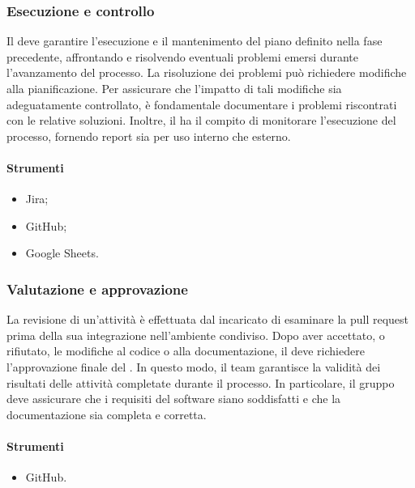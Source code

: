 \subsubsection{Esecuzione e controllo}
\par Il \Responsabile{} deve garantire l'esecuzione e il mantenimento del piano definito nella fase precedente, affrontando e risolvendo eventuali problemi emersi durante l'avanzamento del processo. La risoluzione dei problemi può richiedere modifiche alla pianificazione. Per assicurare che l'impatto di tali modifiche sia adeguatamente controllato, è fondamentale documentare i problemi riscontrati con le relative soluzioni. Inoltre, il \Responsabile{} ha il compito di monitorare l'esecuzione del processo, fornendo report sia per uso interno che esterno.

\paragraph*{Strumenti}
\IntroStrumenti
\begin{itemize}
  \item Jira;
  \item GitHub;
  \item Google Sheets.
\end{itemize}

\subsubsection{Valutazione e approvazione}
\par La revisione di un'attività è effettuata dal \Verificatore{} incaricato di esaminare la pull request prima della sua integrazione nell'ambiente condiviso. Dopo aver accettato, o rifiutato, le modifiche al codice o alla documentazione, il \Verificatore{} deve richiedere l'approvazione finale del \Responsabile{}. In questo modo, il team garantisce la validità dei risultati delle attività completate durante il processo. In particolare, il gruppo deve assicurare che i requisiti del software siano soddisfatti e che la documentazione sia completa e corretta.

\paragraph*{Strumenti}
\IntroStrumenti
\begin{itemize}
  \item GitHub.
\end{itemize}

